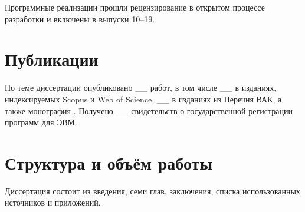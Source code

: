 Программные реализации прошли рецензирование в открытом процессе разработки
\pg{} и включены в выпуски 10--19.

\section*{Публикации}

По теме диссертации опубликовано \_\_ работ, в том числе \_\_ в изданиях,
индексируемых Scopus и Web of Science, \_\_ в изданиях из Перечня ВАК, а также
монография \cite{borodin2012monograph}. Получено \_\_ свидетельств о
государственной регистрации программ для ЭВМ.


\section*{Структура и объём работы}

Диссертация состоит из введения, семи глав, заключения, списка использованных
источников и приложений.
